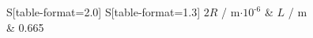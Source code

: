 \begin{table}[!htp]
\centering
\caption{Eigenschaften des Drahtes.}
\label{tab:draht}
\begin{tabular}{S[table-format=2.0] S[table-format=1.3]}
\toprule
{$2R$ / m$\cdot 10^\text{-6}$} & {$L$ / m} \\
 & 0.665 \\
\bottomrule
\end{tabular}
\end{table}